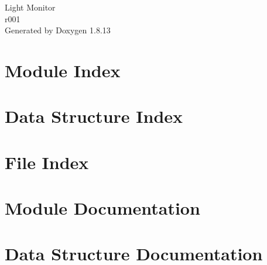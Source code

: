 \documentclass[twoside]{book}
\newcommand{\+}{\discretionary{\mbox{\scriptsize$\hookleftarrow$}}{}{}}
\newcommand{\clearemptydoublepage}{%
  \newpage{\pagestyle{empty}\cleardoublepage}%
}
\begin{document}
\hypersetup{pageanchor=false,
             bookmarksnumbered=true,
             pdfencoding=unicode
            }
\begin{titlepage}
\vspace*{7cm}
\begin{center}%
{\Large Light Monitor \\[1ex]\large r001 }\\
\vspace*{1cm}
{\large Generated by Doxygen 1.8.13}\\
\end{center}
\end{titlepage}
\clearemptydoublepage
{}
\tableofcontents
\clearemptydoublepage
{}
\hypersetup{pageanchor=true}

\chapter{Module Index}

\chapter{Data Structure Index}

\chapter{File Index}

\chapter{Module Documentation}









\chapter{Data Structure Documentation}










\end{document}
